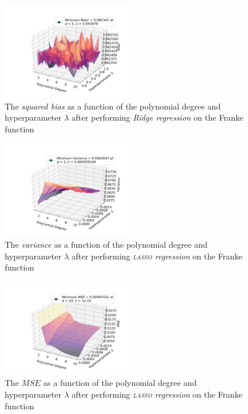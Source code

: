 \documentclass[a4paper,10pt,english]{article}
\begin{document}
\begin{figure}[H]
	\centering 
	\includegraphics[width = 0.5\textwidth, center]{../franke_output/part_D_4.png}
	\caption{The \textit{squared bias} as a function of the polynomial degree and hyperparameter $\lambda$ after performing \textit{Ridge regression} on the Franke function}
	\label{fig_11}
\end{figure}

\begin{figure}[H]
	\centering 
	\includegraphics[width = 0.5\textwidth, center]{../franke_output/part_E_1.png}
	\caption{The \textit{variance} as a function of the polynomial degree and hyperparameter $\lambda$ after performing \textit{\textsc{lasso} regression} on the Franke function}
	\label{fig_12}
\end{figure}

\begin{figure}[H]
	\centering 
	\includegraphics[width = 0.5\textwidth, center]{../franke_output/part_E_2.png}
	\caption{The $MSE$ as a function of the polynomial degree and hyperparameter $\lambda$ after performing \textit{\textsc{lasso} regression} on the Franke function}
	\label{fig_13}
\end{figure}
\end{document}
